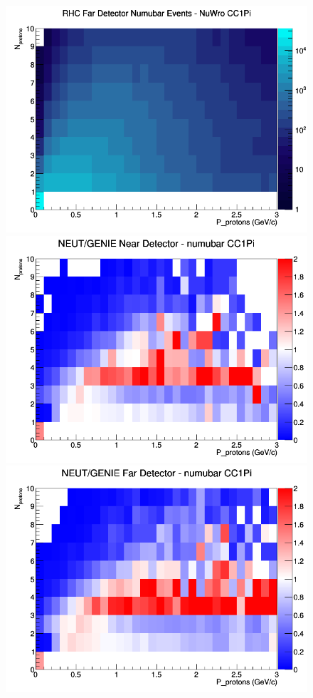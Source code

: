 \begin{figure}[h]
\endminipage
{}
\includegraphics[width=\linewidth]{N_P/nominal/protons/CC1Pi_RHC_FD_numubar_N_P_NuWro.png}
\endminipage
\newline
{}
\includegraphics[width=\linewidth]{N_P/nominal/protons/ratios/CC1Pi_NEUT_GENIE_numubar_near_N_P.png}
\endminipage
{}
\includegraphics[width=\linewidth]{N_P/nominal/protons/ratios/CC1Pi_NEUT_GENIE_numubar_far_N_P.png}

\end{figure}
